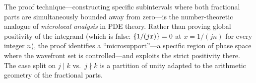 \begin{remark}
The proof technique---constructing specific subintervals where both
fractional parts are simultaneously bounded away from zero---is the
number-theoretic analogue of \emph{microlocal analysis} in PDE theory.
Rather than proving global positivity of the integrand (which is false:
$\{1/(jx)\} = 0$ at $x = 1/(jn)$ for every integer $n$), the proof
identifies a ``microsupport''---a specific region of phase space where
the wavefront set is controlled---and exploits the strict positivity
there. The case split on $j \mid k$ vs.\ $j \nmid k$ is a partition
of unity adapted to the arithmetic geometry of the fractional parts.
\end{remark}
